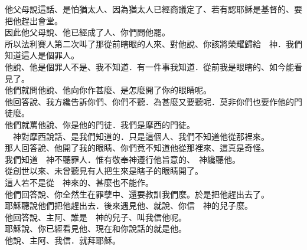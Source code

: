 \documentclass[10pt]{article} %
\begin{document}
\begin{spacing}{0.93}
{\begin{minipage}[t]{\textwidth}
\begin{CJK}{UTF8}{bsmi}
他父母說這話、是怕猶太人、因為猶太人已經商議定了、若有認耶穌是基督的、要把他趕出會堂。\\
因此他父母說、他已經成了人、你們問他罷。\\
所以法利賽人第二次叫了那從前瞎眼的人來、對他說、你該將榮耀歸給　神．我們知道這人是個罪人。\\
他說、他是個罪人不是、我不知道．有一件事我知道．從前我是眼瞎的、如今能看見了。\\
他們就問他說、他向你作甚麼、是怎麼開了你的眼睛呢。\\
他回答說、我方纔告訴你們、你們不聽．為甚麼又要聽呢．莫非你們也要作他的門徒麼。\\
他們就罵他說、你是他的門徒．我們是摩西的門徒。\\
　神對摩西說話、是我們知道的．只是這個人、我們不知道他從那裡來。\\
那人回答說、他開了我的眼睛、你們竟不知道他從那裡來、這真是奇怪。\\
我們知道　神不聽罪人．惟有敬奉神遵行他旨意的、　神纔聽他。\\
從創世以來、未曾聽見有人把生來是瞎子的眼睛開了。\\
這人若不是從　神來的、甚麼也不能作。\\
他們回答說、你全然生在罪孽中、還要教訓我們麼。於是把他趕出去了。\\
耶穌聽說他們把他趕出去．後來遇見他、就說、你信　神的兒子麼。\\
他回答說、主阿、誰是　神的兒子、叫我信他呢。\\
耶穌說、你已經看見他、現在和你說話的就是他。\\
他說、主阿、我信．就拜耶穌。\\

\end{CJK}
\end{minipage}}
\end{spacing}
\vspace*{\fill}
\end{document}
